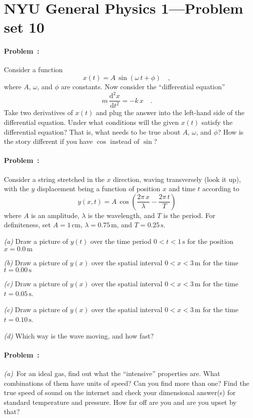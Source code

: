 \documentclass[12pt]{article}
\newcommand{\m}{\mathrm{m}}
\newcommand{\cm}{\mathrm{cm}}
\newcommand{\s}{\mathrm{s}}
\newcommand{\dd}{\mathrm{d}}
\newcounter{problem}
\begin{document}
\thispagestyle{empty}

\section*{NYU General Physics 1---Problem set 10}

\paragraph{Problem~\theproblem:}%
Consider a function $$x(t) = A\,\sin(\omega\,t + \phi) \quad,$$ where
$A$, $\omega$, and $\phi$ are constants.  Now consider the
``differential equation'' $$m\,\frac{\dd^2 x}{\dd t^2} = -k\,x
\quad.$$ Take two derivatives of $x(t)$ and plug the answer into the left-hand
side of the differential equation.  Under what conditions will the
given $x(t)$ satisfy the differential equation?  That is, what needs
to be true about $A$, $\omega$, and $\phi$?  How is the story
different if you have $\cos$ instead of $\sin$?

\paragraph{Problem~\theproblem:}%
Consider a string stretched in the $x$ direction, waving transversely
(look it up), with the $y$ displacement being a function of position
$x$ and time $t$ according to
$$ y(x,t) = A\,\cos(\frac{2\pi\,x}{\lambda} - \frac{2\pi\,t}{T}) $$
where $A$ is an amplitude, $\lambda$ is the wavelength, and $T$ is
the period.  For definiteness, set $A=1\,\cm$, $\lambda=0.75\,\m$, and
$T=0.25\,\s$.

\textsl{(a)} Draw a picture of $y(t)$ over the time period $0<t<1\,\s$
for the position $x=0.0\,\m$

\textsl{(b)} Draw a picture of $y(x)$ over the spatial interval $0<x<3\,\m$
for the time $t=0.00\,\s$

\textsl{(c)} Draw a picture of $y(x)$ over the spatial interval $0<x<3\,\m$
for the time $t=0.05\,\s$.

\textsl{(c)} Draw a picture of $y(x)$ over the spatial interval $0<x<3\,\m$
for the time $t=0.10\,\s$.

\textsl{(d)} Which way is the wave moving, and how fast?

\paragraph{Problem~\theproblem:}%
\textsl{(a)}~For an ideal gas, find out what the ``intensive''
properties are.  What combinations of them have units of speed?  Can
you find more than one?  Find the true speed of sound on the internet
and check your dimensional answer(s) for standard temperature and
pressure.  How far off are you and are you upset by that?
\end{document}
